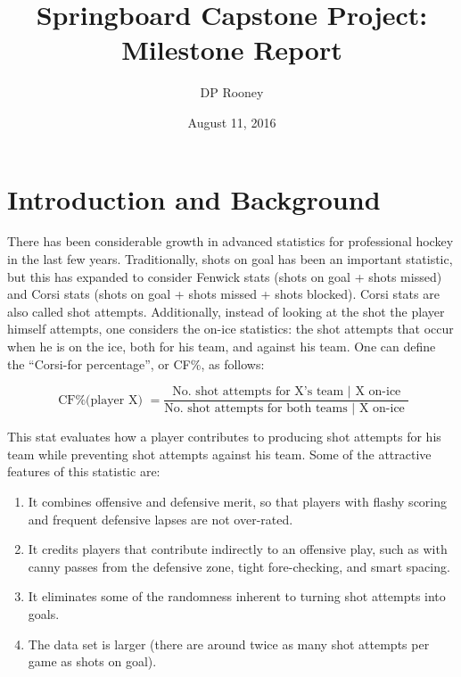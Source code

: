 \documentclass[11pt]{article}
\begin{document}
    \title{Springboard Capstone Project: Milestone Report}
\author{DP Rooney}

\date{August 11, 2016}
    
    
    \maketitle
    
    

    


    \section{Introduction and
Background}\label{introduction-and-background}

There has been considerable growth in advanced statistics for
professional hockey in the last few years. Traditionally, shots on goal
has been an important statistic, but this has expanded to consider
Fenwick stats (shots on goal + shots missed) and Corsi stats (shots on
goal + shots missed + shots blocked). Corsi stats are also called shot
attempts. Additionally, instead of looking at the shot the player
himself attempts, one considers the on-ice statistics: the shot
attempts that occur when he is on the ice, both for his team, and
against his team. One can define the ``Corsi-for percentage'', or CF\%,
as follows:

\[\textrm{ CF\%(player X) } = \frac{\textrm{No. shot attempts for X's team | X on-ice}}{\textrm{No. shot attempts for both teams | X on-ice }} \]

\noindent This stat evaluates how a player contributes to producing shot attempts
for his team while preventing shot attempts against his team. Some of
the attractive features of this statistic are:

\begin{enumerate}
\def\labelenumi{\arabic{enumi}.}
\itemsep1pt\parskip0pt
\item
  It combines offensive and defensive merit, so that players with flashy
  scoring and frequent defensive lapses are not over-rated.
\item
  It credits players that contribute indirectly to an offensive play,
  such as with canny passes from the defensive zone, tight
  fore-checking, and smart spacing.
\item
  It eliminates some of the randomness inherent to turning shot attempts
  into goals.
\item
  The data set is larger (there are around twice as many shot attempts per game
  as shots on goal).
\end{enumerate}
\end{document}
